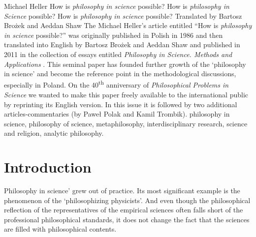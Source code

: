 \begin{artengenv}{Michael Heller}
	{How is \textit{philosophy in science} possible?}
	{How is \textit{philosophy in Science} possible?}
	{How is \textit{philosophy in science} possible?}
	{Translated by Bartosz Brożek and Aeddan Shaw\label{heller-start}}
	{The Michael Heller's article entitled ``How is \textit{philosophy in science} possible?'' was originally published in Polish in 1986
		\parencite[see][]{heller_jakmozliwa_1986} and then translated into English by Bartosz Brożek and Aeddan Shaw and published in 2011 in the collection of essays entitled \textit{Philosophy in Science. Methods and Applications} \parencite{heller_howpossible_2011}. This seminal paper has founded further growth of the `philosophy in science' and become the reference point in the methodological discussions, especially in Poland. On the 40\textsuperscript{th} anniversary of \textit{Philosophical Problems in Science} we wanted to make this paper freely available to the international public by reprinting its English version. In this issue it is followed by two additional articles-commentaries (by Paweł Polak and Kamil Trombik).}
	{philosophy in science, philosophy of science, metaphilosophy, interdisciplinary research, science and religion, analytic philosophy.}



\section{Introduction}


\lettrine[loversize=0.13,lines=2,lraise=-0.05,nindent=0em,findent=0.2pt]%
{P}{}hilosophy in science' grew out of practice.\label{heller-out-of} Its most significant example is the phenomenon of the `philosophizing
physicists'. And even though the philosophical reflection of the representatives of the empirical sciences often falls
short of the professional philosophical standards, it does not change the fact that the sciences are filled with
philosophical contents.

%


\end{artengenv}
